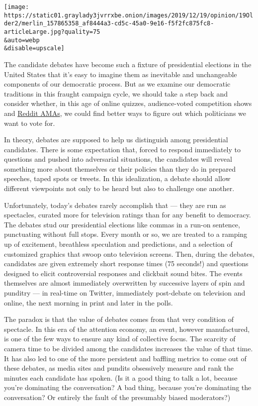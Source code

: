 \texttt{[image: https://static01.graylady3jvrrxbe.onion/images/2019/12/19/opinion/19Older2/merlin\_157865358\_af8444a3-cd5c-45a0-9e16-f5f2fc875fc8-articleLarge.jpg?quality=75\\\&auto=webp\\\&disable=upscale]}

The candidate debates have become such a fixture of presidential
elections in the United States that it's easy to imagine them as
inevitable and unchangeable components of our democratic process. But as
we examine our democratic traditions in this fraught campaign cycle, we
should take a step back and consider whether, in this age of online
quizzes, audience-voted competition shows and
\href{https://www.reddit.com/r/IAmA/}{Reddit AMAs}, we could find better
ways to figure out which politicians we want to vote for.

In theory, debates are supposed to help us distinguish among
presidential candidates. There is some expectation that, forced to
respond immediately to questions and pushed into adversarial situations,
the candidates will reveal something more about themselves or their
policies than they do in prepared speeches, taped spots or tweets. In
this idealization, a debate should allow different viewpoints not only
to be heard but also to challenge one another.

Unfortunately, today's debates rarely accomplish that --- they are run
as spectacles, curated more for television ratings than for any benefit
to democracy. The debates stud our presidential elections like commas in
a run-on sentence, punctuating without full stops. Every month or so, we
are treated to a ramping up of excitement, breathless speculation and
predictions, and a selection of customized graphics that swoop onto
television screens. Then, during the debates, candidates are given
extremely short response times (75 seconds!) and questions designed to
elicit controversial responses and clickbait sound bites. The events
themselves are almost immediately overwritten by successive layers of
spin and punditry --- in real-time on Twitter, immediately post-debate
on television and online, the next morning in print and later in the
polls.

The paradox is that the value of debates comes from that very condition
of spectacle. In this era of the attention economy, an event, however
manufactured, is one of the few ways to ensure any kind of collective
focus. The scarcity of camera time to be divided among the candidates
increases the value of that time. It has also led to one of the more
persistent and baffling metrics to come out of these debates, as media
sites and pundits obsessively measure and rank the minutes each
candidate has spoken. (Is it a good thing to talk a lot, because you're
dominating the conversation? A bad thing, because you're dominating the
conversation? Or entirely the fault of the presumably biased
moderators?)


